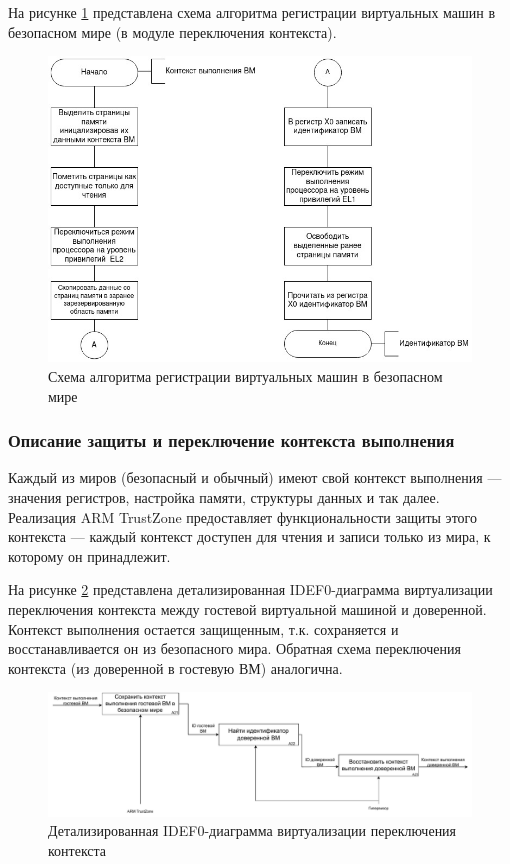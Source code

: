 На рисунке \ref{fig:move-pte-algo} представлена схема алгоритма регистрации виртуальных машин в безопасном мире (в модуле переключения контекста).

\begin{figure}[h!]
	\centering
	\includegraphics[scale=0.6]{img/algo_1.jpg}
	\caption{Схема алгоритма регистрации виртуальных машин в безопасном мире}
	\label{fig:move-pte-algo}
\end{figure}

\subsubsection{Описание защиты и переключение контекста выполнения}

Каждый из миров (безопасный и обычный) имеют свой контекст выполнения --- значения регистров, настройка памяти, структуры данных и так далее. Реализация ARM TrustZone предоставляет функциональности защиты этого контекста --- каждый контекст доступен для чтения и записи только из мира, к которому он принадлежит.

На рисунке \ref{fig:idef0-context-switch-2} представлена детализированная IDEF0-диаграмма виртуализации переключения контекста между гостевой виртуальной машиной и доверенной. Контекст выполнения остается защищенным, т.к. сохраняется и восстанавливается он из безопасного мира. Обратная схема переключения контекста (из доверенной в гостевую ВМ) аналогична.

\begin{figure}[h!]
	\centering
	\includegraphics[width=\textwidth]{img/idef0-context-switch-2.pdf}
	\caption{Детализированная IDEF0-диаграмма виртуализации переключения контекста}
	\label{fig:idef0-context-switch-2}
\end{figure}

